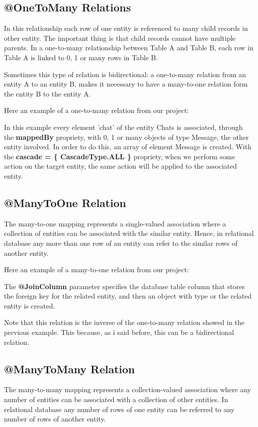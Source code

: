 \documentclass[a4paper]{article}
\begin{document}
\subsection{@OneToMany Relations}
In this relationship each row of one entity is referenced to many child records in other entity. The important thing is that child records cannot have multiple parents. In a one-to-many relationship between Table A and Table B, each row in Table A is linked to 0, 1 or many rows in Table B.

Sometimes this type of relation is bidirectional: a one-to-many relation from an entity A to an entity B, makes it necessary to have a many-to-one relation form the entity B to the entity A.

Here an example of a one-to-many relation from our project:

In this example every element 'chat' of the entity Chats is associated, through the \textbf{mappedBy} propriety, with 0, 1 or many objects of type Message, the other entity involved. In order to do this, an array of element Message is created. With the \textbf{cascade = \{ CascadeType.ALL \}} propriety, when we perform some action on the target entity, the same action will be applied to the associated entity.

\subsection{@ManyToOne Relation}
The many-to-one mapping represents a single-valued association where a collection of entities can be associated with the similar entity. Hence, in relational database any more than one row of an entity can refer to the similar rows of another entity.

Here an example of a many-to-one relation from our project:

The \textbf{@JoinColumn} parameter specifies the database table column that stores the foreign key for the related entity, and then an object with type or the related entity is created.

Note that this relation is the inverse of the one-to-many relation showed in the previous example. This because, as i said before, this can be a bidirectional relation. 

\subsection{@ManyToMany Relation}
The many-to-many mapping represents a collection-valued association where any number of entities can be associated with a collection of other entities. In relational database any number of rows of one entity can be referred to any number of rows of another entity.
\end{document}

